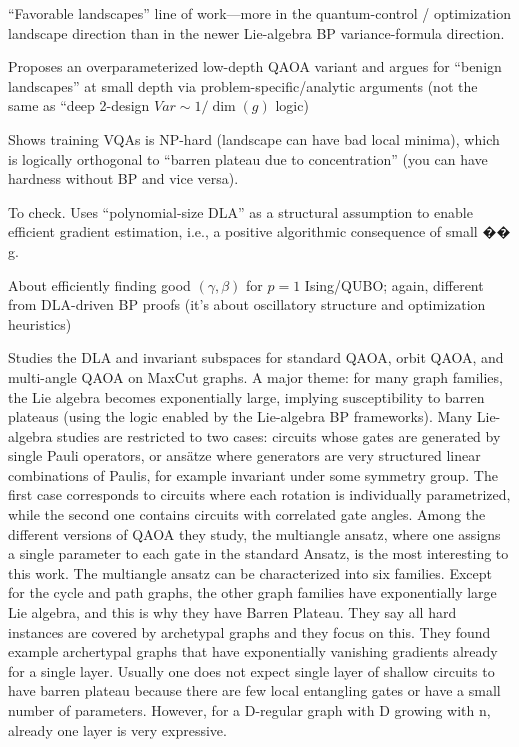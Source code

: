 \documentclass[a4paper,onecolumn,notitlepage,nofootinbib,longbibliography,superscriptaddress, floatfix, pra, aps, 10pt]{revtex4-2}
\begin{document}
\cite{Larocca_2022}

\cite{Lee_2021} “Favorable landscapes” line of work—more in the quantum-control / optimization landscape direction than in the newer Lie-algebra BP variance-formula direction.

\cite{Vijendran_2024}
Proposes an overparameterized low-depth QAOA variant and argues for “benign landscapes” at small depth via problem-specific/analytic arguments (not the same as “deep 2-design $Var \sim 1/\dim(g)$ logic)

\cite{Bittel_2021} Shows training VQAs is NP-hard (landscape can have bad local minima), which is logically orthogonal to “barren plateau due to concentration” (you can have hardness without BP and vice versa).

\cite{heidari2024efficientgradientestimationvariational} To check. Uses “polynomial-size DLA” as a structural assumption to enable efficient gradient estimation, i.e., a positive algorithmic consequence of small 
��
g.

\cite{vijendran2025nearoptimalparametertuninglevel1} About efficiently finding good $(γ,β)$ for $p=1$ Ising/QUBO; again, different from DLA-driven BP proofs (it’s about oscillatory structure and optimization heuristics)

\cite{yfwq-yqmk} Studies the DLA and invariant subspaces for standard QAOA, orbit QAOA, and multi-angle QAOA on MaxCut graphs. A major theme: for many graph families, the Lie algebra becomes exponentially large, implying susceptibility to barren plateaus (using the logic enabled by the Lie-algebra BP frameworks). Many Lie-algebra studies are restricted to two cases: circuits whose gates are generated by single Pauli operators, or ansätze where generators are very structured linear combinations of Paulis, for example invariant under some symmetry group. The first case corresponds to circuits where each rotation is
individually parametrized, while the second one contains circuits with correlated gate angles. Among the different versions of QAOA they study, the multiangle ansatz, where one assigns a single parameter to each gate in the standard Ansatz, is the most interesting to this work. The multiangle ansatz can be characterized into six families. Except for the cycle and path graphs, the other graph families have exponentially large Lie algebra, and this is why they have Barren Plateau. They say all hard instances are covered by archetypal graphs and they focus on this. They found example archertypal graphs that have exponentially vanishing gradients already for a single layer. Usually one does not expect single layer of shallow circuits to have barren plateau because there are few local entangling gates or have a small number of parameters. However, for a D-regular graph with D growing with n, already one layer is very expressive. 
\end{document}
